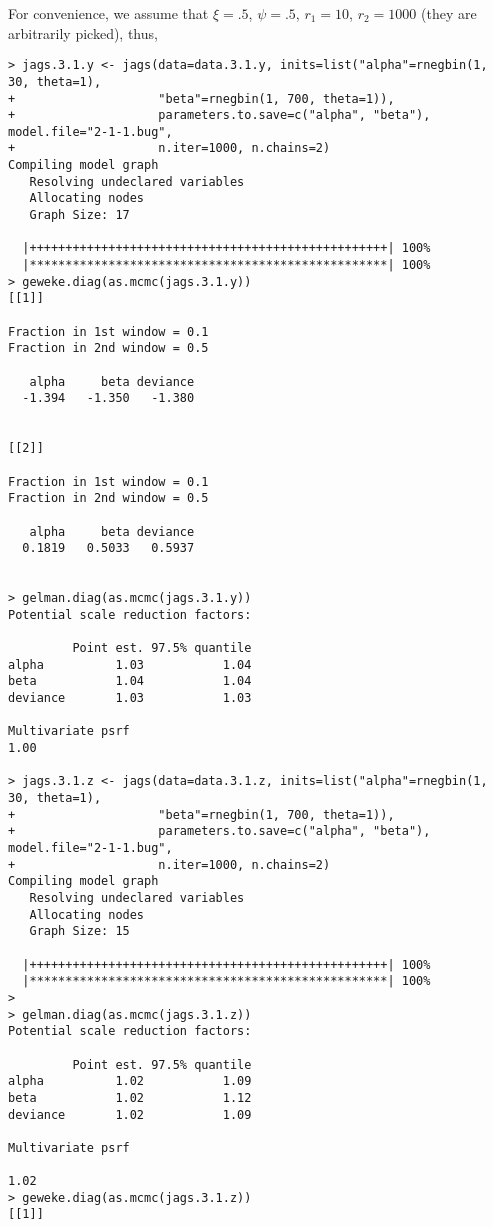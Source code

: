 \documentclass[twoside,11pt]{amsart}
\begin{document}
\begin{enumerate}
\begin{enumerate}
    For convenience, we assume that $\xi = .5$, $\psi = .5$, $r_1=10$,
    $r_2=1000$ (they are arbitrarily picked), thus, 
    \begin{small}
    \begin{verbatim}
> jags.3.1.y <- jags(data=data.3.1.y, inits=list("alpha"=rnegbin(1, 30, theta=1), 
+                    "beta"=rnegbin(1, 700, theta=1)),
+                    parameters.to.save=c("alpha", "beta"), model.file="2-1-1.bug",
+                    n.iter=1000, n.chains=2)
Compiling model graph
   Resolving undeclared variables
   Allocating nodes
   Graph Size: 17

  |++++++++++++++++++++++++++++++++++++++++++++++++++| 100%
  |**************************************************| 100%
> geweke.diag(as.mcmc(jags.3.1.y))
[[1]]

Fraction in 1st window = 0.1
Fraction in 2nd window = 0.5 

   alpha     beta deviance 
  -1.394   -1.350   -1.380 


[[2]]

Fraction in 1st window = 0.1
Fraction in 2nd window = 0.5 

   alpha     beta deviance 
  0.1819   0.5033   0.5937 


> gelman.diag(as.mcmc(jags.3.1.y))
Potential scale reduction factors:

         Point est. 97.5% quantile
alpha          1.03           1.04
beta           1.04           1.04
deviance       1.03           1.03

Multivariate psrf
1.00

> jags.3.1.z <- jags(data=data.3.1.z, inits=list("alpha"=rnegbin(1, 30, theta=1), 
+                    "beta"=rnegbin(1, 700, theta=1)),
+                    parameters.to.save=c("alpha", "beta"), model.file="2-1-1.bug",
+                    n.iter=1000, n.chains=2)
Compiling model graph
   Resolving undeclared variables
   Allocating nodes
   Graph Size: 15

  |++++++++++++++++++++++++++++++++++++++++++++++++++| 100%
  |**************************************************| 100%
> 
> gelman.diag(as.mcmc(jags.3.1.z))
Potential scale reduction factors:

         Point est. 97.5% quantile
alpha          1.02           1.09
beta           1.02           1.12
deviance       1.02           1.09

Multivariate psrf

1.02
> geweke.diag(as.mcmc(jags.3.1.z))
[[1]]


\end{verbatim}
\end{small}
\end{enumerate}
\end{enumerate}
\end{document}
